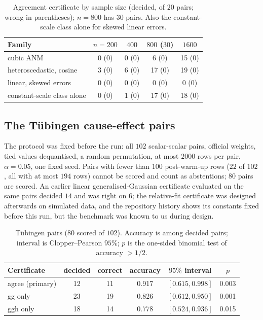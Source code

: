 \begin{table}[t]
\caption{Agreement certificate by sample size (decided, of $20$ pairs; wrong in
parentheses); $n=800$ has $30$ pairs. Also the constant-scale class alone for
skewed linear errors.}\label{tab:sweep}
\small
\begin{tabular}{@{}lcccc@{}}
\toprule
Family & $n=200$ & $400$ & $800$ ($30$) & $1600$\\
\midrule
cubic ANM & 0 (0) & 0 (0) & 6 (0) & 15 (0)\\
heteroscedastic, cosine & 3 (0) & 6 (0) & 17 (0) & 19 (0)\\
linear, skewed errors & 0 (0) & 0 (0) & 0 (0) & 0 (0)\\
\quad constant-scale class alone & 0 (0) & 1 (0) & 17 (0) & 18 (0)\\
\bottomrule
\end{tabular}
\end{table}

\subsection{The Tübingen cause-effect pairs}\label{sec:exp-tuebingen}

The protocol was fixed before the run: all $102$ scalar-scalar pairs, official
weights, tied values dequantised, a random permutation, at most $2000$ rows per
pair, $\alpha=0.05$, one fixed seed. Pairs with fewer than $100$ post-warm-up
rows ($22$ of $102$, all with at most $194$ rows) cannot be scored and count as
abstentions; $80$ pairs are scored. An earlier linear generalised-Gaussian
certificate evaluated on the same pairs decided $14$ and was right on $6$; the
relative-fit certificate was designed afterwards on simulated data, and the
repository history shows its constants fixed before this run, but the benchmark was
known to us during design.

\begin{table}[t]
\caption{Tübingen pairs ($80$ scored of $102$). Accuracy is among decided pairs;
interval is Clopper--Pearson $95\%$; $p$ is the one-sided binomial test of accuracy
$>1/2$.}\label{tab:tuebingen}
\begin{tabular}{@{}lccccc@{}}
\toprule
Certificate & decided & correct & accuracy & $95\%$ interval & $p$\\
\midrule
agree (primary) & 12 & 11 & 0.917 & $[0.615,0.998]$ & 0.003\\
gg only & 23 & 19 & 0.826 & $[0.612,0.950]$ & 0.001\\
ggh only & 18 & 14 & 0.778 & $[0.524,0.936]$ & 0.015\\
\bottomrule
\end{tabular}
\end{table}

